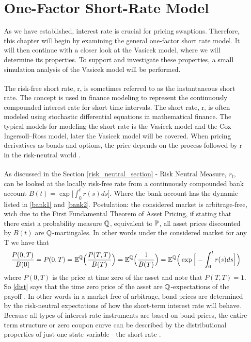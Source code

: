 \section{One-Factor Short-Rate Model}
As we have established, interest rate is crucial 
for pricing swaptions. Therefore, this chapter will 
begin by examining the general one-factor short rate 
model. It will then continue with a closer look at the 
Vasicek model, where we will determine its properties. 
To support and investigate these properties, a small 
simulation analysis of the Vasicek model will be 
performed.
\\\\
The risk-free short rate, r, is sometimes referred to as the instantaneous short rate. 
The concept is used in finance modeling to represent the continuously compounded interest rate for 
short time intervals. The short rate, r, is often modeled using stochastic differential equations in 
mathematical finance. The typical models for modeling the short rate is the Vasicek model and the Cox–Ingersoll–Ross model, 
later the Vasicek model will be covered. When pricing derivatives as bonds and options, the price depends on 
the process followed by r in the risk-neutral world \cite{Hull}.
\\\\
As discussed in the Section \ref{risk_neutral_section} - Risk Neutral Measure, $r_t$, can be looked at the locally risk-free 
rate from a continuously compounded bank account $B(t)= \exp \Big[\int_{0}^{t} r(s) ds \Big]$. 
Where the bank account has the dynamic listed in \autoref{bank1} and \autoref{bank2}.
Postulation: the considered market is arbitrage-free, wich due to the First Fundamental Theorem of Asset Pricing, 
if stating that there exist a probability measure $\mathbb{Q}$, equivalent to $\mathbb{P}$, all asset prices discounted by $B(t)$
are $\mathbb{Q}$-martingales. In other words under the considered market for any T we have that 
\begin{align}
    \frac{P(0,T)}{B(0)} = P(0,T) = \mathbb{E}^{\mathbb{Q}} \Big( \frac{P(T,T)}{B(T)}\Big) = \mathbb{E}^{\mathbb{Q}} \Big( \frac{1}{B(T)}\Big) 
    = \mathbb{E}^{\mathbb{Q}} \Big( \exp \Big[ - \int_{0}^{t}r(s)ds \Big] \Big)
    \label{dist}
\end{align}
where $P(0,T)$ is the price at time zero of the asset and note that $P(T,T)=1$. So \autoref{dist} says that 
the time zero price of the asset are $\mathbb{Q}$-expectations  of the payoff \cite{Bermudan}.
In other words in a market free of arbitrage, bond prices are determined by the risk-neutral expectations 
of how the short-term interest rate will behave. Because all types of interest rate instruments are based
on bond prices, the entire term structure or zero coupon curve can be described by the distributional properties
of just one state variable - the short rate \cite{Bermudan}.

